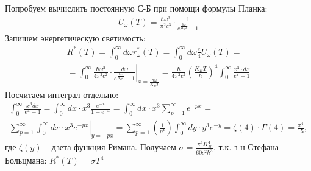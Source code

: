 Попробуем вычислить постоянную С-Б при помощи формулы Планка:
	\begin{gather*}
	U_\omega(T)=\frac{\hbar\omega^3}{\pi^2c^3}\cdot\frac{1}{e^{\frac{\hbar\omega}{K_BT}}-1}
	\end{gather*}
	Запишем энергетическую светимость:
	\begin{gather*}
	R^\ast(T)
	=
	\int_{0}^{\infty}d\omega r^\ast_\omega(T)
	=
	\int_{0}^{\infty}d\omega\frac{c}{4}U_\omega(T)
	=\\
	=
	\left.
	\int_{0}^{\infty}\frac{\hbar\omega^3}{4\pi^2c^2}\cdot\frac{d\omega}{e^{\frac{\hbar\omega}{K_BT}}-1}
	\right|_{x=\frac{\hbar\omega}{K_BT}}
	=
	\frac{\hbar}{4\pi^2c^2}\left(\frac{K_BT}{\hbar}\right)^4\int_{0}^{\infty}\frac{x^3\cdot dx}{e^x-1}
	\end{gather*}
	Посчитаем интеграл отдельно:
	\begin{gather*}
	\int_{0}^{\infty}\frac{x^3dx}{e^x-1}
	=
	\int_{0}^{\infty}dx\cdot x^3\frac{e^{-x}}{1-e^{-x}}
	=
	\int_{0}^{\infty}dx\cdot x^3\sum_{p=1}^{\infty}e^{-px}
	=\\
	\left.
	\sum_{p=1}^{\infty}\int_{0}^{\infty}dx\cdot x^3e^{-px}
	\right|_{y=-px}
	=
	\sum_{p=1}^{\infty}\left(\frac{1}{p^4}\right)\int_{0}^{\infty}dy\cdot y^3e^{-y}
	=
	\zeta(4)\cdot\Gamma(4)
	=
	\frac{\pi^4}{15},
	\end{gather*}
	где $\zeta(y)$ -- дзета-функция Римана.
	Получаем $\sigma=\frac{\pi^2K_B^4}{60c^2\hbar^3}$, т.к. з-н Стефана-Больцмана: $R^\ast(T)=\sigma T^4$
	
	
